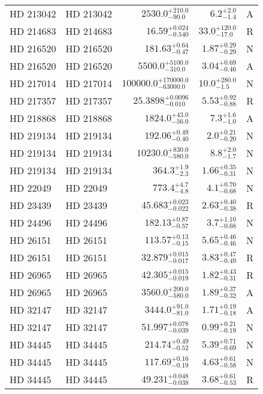 \begin{longtable*}{llrrr}
HD 213042 & HD 213042 & $2530.0^{+210.0}_{-90.0}$ & $6.2^{+2.0}_{-1.4}$ & A \\ 
HD 214683 & HD 214683 & $16.59^{+0.024}_{-0.540}$ & $33.0^{+120.0}_{-17.0}$ & R \\ 
HD 216520 & HD 216520 & $181.63^{+0.64}_{-0.47}$ & $1.87^{+0.29}_{-0.29}$ & N \\ 
HD 216520 & HD 216520 & $5500.0^{+5100.0}_{-310.0}$ & $3.04^{+0.69}_{-0.46}$ & A \\ 
HD 217014 & HD 217014 & $100000.0^{+170000.0}_{-63000.0}$ & $10.0^{+280.0}_{-1.5}$ & N \\ 
HD 217357 & HD 217357 & $25.3898^{+0.0096}_{-0.010}$ & $5.53^{+0.92}_{-0.88}$ & R \\ 
HD 218868 & HD 218868 & $1824.0^{+43.0}_{-56.0}$ & $7.3^{+1.6}_{-1.0}$ & A \\ 
HD 219134 & HD 219134 & $192.06^{+0.49}_{-0.40}$ & $2.0^{+0.21}_{-0.20}$ & N \\ 
HD 219134 & HD 219134 & $10230.0^{+830.0}_{-580.0}$ & $8.8^{+2.0}_{-1.7}$ & N \\ 
HD 219134 & HD 219134 & $364.3^{+1.9}_{-2.3}$ & $1.66^{+0.35}_{-0.31}$ & N \\ 
HD 22049 & HD 22049 & $773.4^{+4.7}_{-4.8}$ & $4.1^{+0.70}_{-0.68}$ & N \\ 
HD 23439 & HD 23439 & $45.683^{+0.023}_{-0.022}$ & $2.63^{+0.40}_{-0.38}$ & R \\ 
HD 24496 & HD 24496 & $182.13^{+0.87}_{-0.57}$ & $3.7^{+1.10}_{-0.68}$ & N \\ 
HD 26151 & HD 26151 & $113.57^{+0.13}_{-0.15}$ & $5.65^{+0.46}_{-0.46}$ & N \\ 
HD 26151 & HD 26151 & $32.879^{+0.015}_{-0.017}$ & $3.83^{+0.47}_{-0.49}$ & R \\ 
HD 26965 & HD 26965 & $42.305^{+0.015}_{-0.019}$ & $1.82^{+0.43}_{-0.31}$ & R \\ 
HD 26965 & HD 26965 & $3560.0^{+200.0}_{-580.0}$ & $1.89^{+0.37}_{-0.32}$ & A \\ 
HD 32147 & HD 32147 & $3444.0^{+91.0}_{-81.0}$ & $1.71^{+0.19}_{-0.18}$ & A \\ 
HD 32147 & HD 32147 & $51.997^{+0.078}_{-0.039}$ & $0.99^{+0.21}_{-0.19}$ & N \\ 
HD 34445 & HD 34445 & $214.74^{+0.49}_{-0.52}$ & $5.39^{+0.71}_{-0.69}$ & N \\ 
HD 34445 & HD 34445 & $117.69^{+0.16}_{-0.19}$ & $4.63^{+0.61}_{-0.58}$ & N \\ 
HD 34445 & HD 34445 & $49.231^{+0.048}_{-0.038}$ & $3.68^{+0.61}_{-0.53}$ & R \\ 

\end{longtable*}
